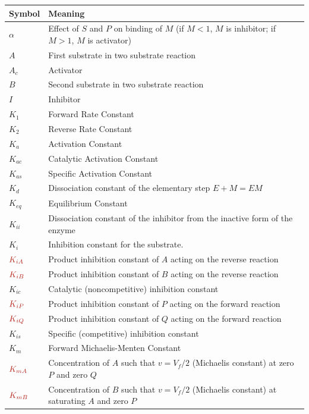 \documentclass[10pt]{cekarticle}
\newcommand{\changed}[1]{\textcolor{BrickRed}{#1}}
\begin{document}
\renewcommand{\arraystretch}{1}
\begin{table}[ht]
  \begin{tabular}{lp{5.5in}}
    \toprule
    \textbf{Symbol} & \textbf{Meaning} \\
    \midrule
    $\alpha$	& Effect of $S$ and $P$ on binding of $M$ (if $M<1$, $M$ is inhibitor; if $M>1$, $M$ is activator) \\
    $A$		& First substrate in two substrate reaction \\
    $A_c$	& Activator \\
    $B$		& Second substrate in two substrate reaction \\
    $I$		& Inhibitor \\
    $K_1$	& Forward Rate Constant \\
    $K_2$	& Reverse Rate Constant \\
    $K_a$	& Activation Constant \\
    $K_{ac}$	& Catalytic Activation Constant \\
    $K_{as}$	& Specific Activation Constant \\
    $K_d$	& Dissociation constant of the elementary step $E + M = EM$ \\
    $K_{eq}$	& Equilibrium Constant \\
    $K_{ii}$	& Dissociation constant of the inhibitor from the inactive form of the enzyme \\
    $K_i$	& Inhibition constant for the substrate. \\
    $\changed{K_{iA}}$	& Product inhibition constant of $A$ acting on the reverse reaction \\
    $\changed{K_{iB}}$	& Product inhibition constant of $B$ acting on the reverse reaction \\
    $K_{ic}$	& Catalytic (noncompetitive) inhibition constant \\
    $\changed{K_{iP}}$	& Product inhibition constant of $P$ acting on the forward reaction \\
    $\changed{K_{iQ}}$	& Product inhibition constant of $Q$ acting on the forward reaction \\
    $K_{is}$	& Specific (competitive) inhibition constant \\
    $K_m$	& Forward Michaelis-Menten Constant \\
    $\changed{K_{mA}}$	& Concentration of $A$ such that $v = V_f/2$  (Michaelis constant) at zero $P$ and zero $Q$ \\
    $\changed{K_{mB}}$	& Concentration of $B$ such that $v = V_f/2$  (Michaelis constant) at saturating $A$ and zero $P$ \\

\end{tabular}
\end{table}
\end{document}
